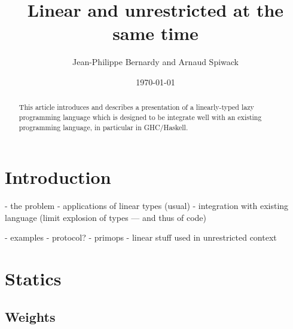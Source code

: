 \documentclass[11pt]{article}
\author{Jean-Philippe Bernardy and Arnaud Spiwack}
\date{\today}
\title{Linear and unrestricted at the same time}
\begin{document}
\maketitle
\begin{abstract}
  \noindent This article introduces and describes a presentation of a
  linearly-typed lazy programming language which is designed to be
  integrate well with an existing programming language, in particular
  in GHC/Haskell.
\end{abstract}

\setcounter{tocdepth}{3}
\tableofcontents

\section{Introduction}

- the problem
  - applications of linear types (usual)
  - integration with existing language (limit explosion of types --- and thus of code)

- examples
  - protocol?
  - primops
  - linear stuff used in unrestricted context

\section{Statics}
\label{sec:orgheadline8}
\subsection{Weights}
\label{sec:orgheadline1}
\end{document}
